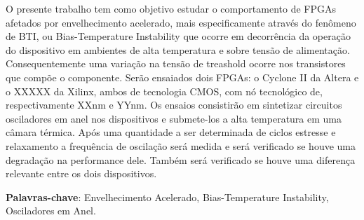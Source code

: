 %	
%   
%	
	
	
	
	
  

    



\begin{resumo}[Resumo]
O presente trabalho tem como objetivo estudar o comportamento de FPGAs afetados por envelhecimento acelerado, mais especificamente através do fenômeno de BTI, ou Bias-Temperature Instability que ocorre em decorrência da operação do dispositivo em ambientes de alta temperatura e sobre tensão de alimentação. Consequentemente uma variação na tensão de treashold ocorre nos transistores que compõe o componente. Serão ensaiados dois FPGAs: o Cyclone II da Altera e o XXXXX da Xilinx, ambos de tecnologia CMOS, com nó tecnológico de, respectivamente XXnm e YYnm. Os ensaios consistirão em sintetizar circuitos osciladores em anel nos dispositivos e submete-los a alta temperatura em uma câmara térmica. Após uma quantidade a ser determinada de ciclos estresse e relaxamento a frequência de oscilação será medida e será verificado se houve uma degradação na performance dele. Também será verificado se houve uma diferença relevante entre os dois dispositivos.

    \vspace{\onelineskip}
	\noindent
        
	\textbf{Palavras-chave}: Envelhecimento Acelerado, Bias-Temperature Instability, Osciladores em Anel.

\end{resumo}

